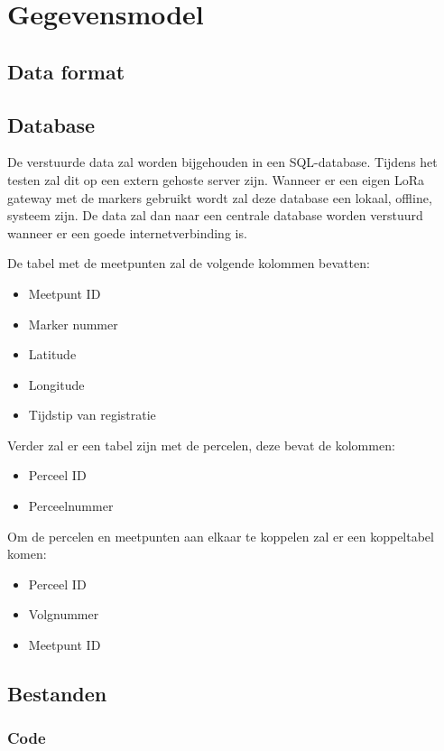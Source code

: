 \section{Gegevensmodel}
\subsection{Data format}
\subsection{Database}
\label{sec:database}

De verstuurde data zal worden bijgehouden in een SQL-database. Tijdens het testen
zal dit op een extern gehoste server zijn.
Wanneer er een eigen LoRa gateway met de markers gebruikt wordt zal deze database
een lokaal, offline, systeem zijn. De data zal dan naar een centrale database
worden verstuurd wanneer er een goede internetverbinding is.

De tabel met de meetpunten zal de volgende kolommen bevatten:
\begin{itemize}
    \item Meetpunt ID
    \item Marker nummer
    \item Latitude
    \item Longitude
    \item Tijdstip van registratie
\end{itemize}

Verder zal er een tabel zijn met de percelen, deze bevat de kolommen:
\begin{itemize}
    \item Perceel ID
    \item Perceelnummer
\end{itemize}

Om de percelen en meetpunten aan elkaar te koppelen zal er een koppeltabel komen:
\begin{itemize}
    \item Perceel ID
    \item Volgnummer
    \item Meetpunt ID
\end{itemize}

\subsection{Bestanden}
\subsubsection{Code}
